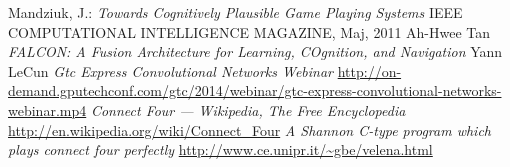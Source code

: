 \documentclass{llncs}
\begin{document}
%
%
\begin{thebibliography}{4}
%
Mandziuk, J.:
\textsl{Towards Cognitively Plausible Game Playing Systems}
IEEE COMPUTATIONAL INTELLIGENCE MAGAZINE, Maj, 2011
Ah-Hwee Tan
\textsl{FALCON: A Fusion Architecture for Learning, COgnition, and Navigation}
Yann LeCun
\textsl{Gtc Express Convolutional Networks Webinar}
\url{http://on-demand.gputechconf.com/gtc/2014/webinar/gtc-express-convolutional-networks-webinar.mp4}
\textsl{Connect Four --- {W}ikipedia{,} The Free Encyclopedia}
\url{http://en.wikipedia.org/wiki/Connect_Four}
\textsl{A Shannon C-type program which plays connect four perfectly}
\url{http://www.ce.unipr.it/~gbe/velena.html}
\end{thebibliography}
\end{document}
